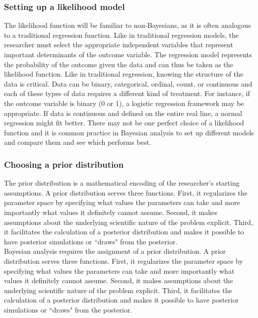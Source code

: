 \documentclass{article}
\begin{document}
\subsubsection{Setting up a likelihood model}
The likelihood function will be familiar to non-Bayesians, as it is often analogous to a traditional regression function. Like in traditional regression models, the researcher must select the appropriate independent variables that represent important determinants of the outcome variable. The regression model represents the probability of the outcome given the data and can thus be taken as the likelihood function. Like in traditional regression, knowing the structure of the data is critical. Data can be binary, categorical, ordinal, count, or continuous and each of these types of data requires a different kind of treatment. For instance, if the outcome variable is binary (0 or 1), a logistic regression framework may be appropriate. If data is continuous and defined on the entire real line, a normal regression might fit better. There may not be one perfect choice of a likelihood function and it is common practice in Bayesian analysis to set up different models and compare them and see which performs best.
\\
 
\subsubsection{Choosing a prior distribution}
The prior distribution is a mathematical encoding of the researcher's starting assumptions. A prior distribution serves three functions. First, it regularizes the parameter space by specifying what values the parameters can take and more importantly what values it definitely cannot assume. Second, it makes assumptions about the underlying scientific nature of the problem explicit. Third, it facilitates the calculation of a posterior distribution and makes it possible to have posterior simulations or ``draws" from the posterior. \\


 Bayesian analysis requires the assignment of a prior distribution. A prior distribution serves three functions. First, it regularizes the parameter space by specifying what values the parameters can take and more importantly what values it definitely cannot assume. Second, it makes assumptions about the underlying scientific nature of the problem explicit. Third, it facilitates the calculation of a posterior distribution and makes it possible to have posterior simulations or ``draws" from the posterior. \\
\end{document}
